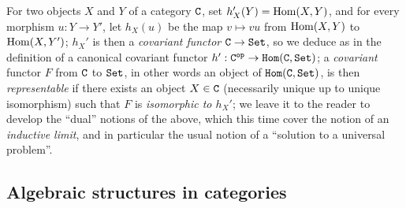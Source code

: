 \begin{env}[8.1.11]
\label{0.8.1.11}
For two objects $X$ and $Y$ of a category $\mathtt{C}$, set $h_X'(Y)={\mathop{\mathrm{Hom}}\nolimits}(X,Y)$, and for every morphism $u:Y\to Y'$, let $h_X(u)$ be the map $v\mapsto vu$ from ${\mathop{\mathrm{Hom}}\nolimits}(X,Y)$ to ${\mathop{\mathrm{Hom}}\nolimits}(X,Y')$; $h_X'$ is then a \emph{covariant functor $\C\to\Set$}, so we deduce as in  the definition of a canonical covariant functor $h':\C\op\to\CHom(\C,\Set)$; a \emph{covariant} functor $F$ from $\mathtt{C}$ to $\mathtt{Set}$, in other words an object of $\mathtt{Hom}(\mathtt{C},\mathtt{Set})$, is then \emph{representable} if there exists an object $X\in\mathtt{C}$ (necessarily unique up to unique isomorphism) such that $F$ is \emph{isomorphic to $h_X'$}; we leave it to the reader to develop the ``dual'' notions of the above, which this time cover the notion of an \emph{inductive limit}, and in particular the usual notion of a ``solution to a universal problem''.
\end{env}

\subsection{Algebraic structures in categories}
\label{subsection:0.8.2}


